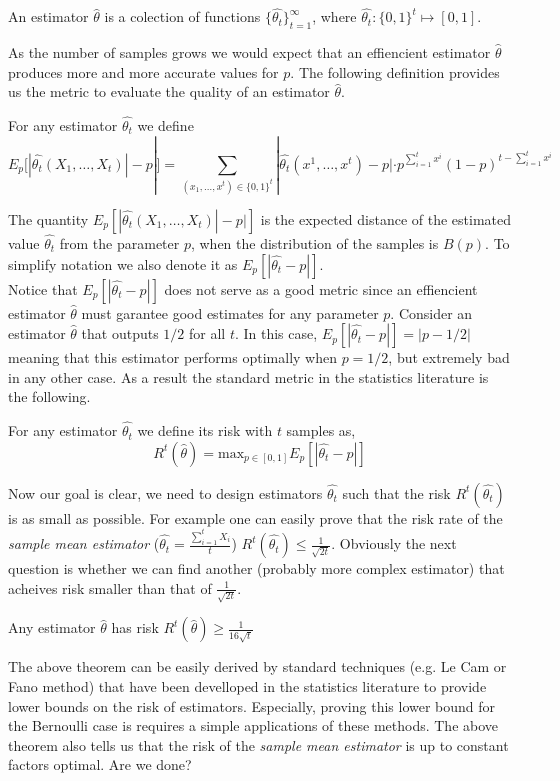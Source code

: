 \begin{definition}
An estimator $\hat{\theta}$ is a colection of functions $\{\hat{\theta_t}\}_{t=1}^{\infty}$, where $\hat{\theta_t}: \{0,1\}^t\mapsto [0,1]$.
\end{definition} As the number of samples grows we would expect that an effiencient estimator $\hat{\theta}$ produces more and more accurate values for $p$. The following definition provides us the metric to evaluate the quality of an estimator $\hat{\theta}$. 

\begin{definition}
For any estimator $\hat{\theta_t}$ we define 
$$E_p[|\hat{\theta_t}(X_1,\ldots,X_t)| - p|]= \sum_{(x_1,\ldots,x^t)\in \{0,1\}^t}|\hat{\theta_t}(x^1,\ldots,x^t) -p| \cdot p^{\sum_{i=1}^tx^i}(1-p)^{t-\sum_{i=1}^tx^i}$$ 
\end{definition}
The quantity $E_p[|\hat{\theta_t}(X_1,\ldots,X_t)| - p|]$ is the expected distance of the estimated value $\hat{\theta_t}$ from the parameter $p$, when the distribution of the samples is $B(p)$. To simplify notation we also denote it as $E_p[|\hat{\theta_t} - p|]$.\\

\noindent Notice that $E_p[|\hat{\theta_t}-p|]$ does not serve as a good metric since an effiencient estimator $\hat{\theta}$ must garantee good estimates for any parameter $p$. Consider an estimator $\hat{\theta}$ that outputs $1/2$ for all $t$. In this case, $E_{p}[|\hat{\theta_t}- p|]=|p-1/2|$ meaning that this estimator performs optimally when $p=1/2$, but extremely bad in any other case. As a result the standard metric in the statistics literature is the following.

\begin{definition}
For any estimator $\hat{\theta_t}$ we define its risk with $t$ samples as, $$R^t(\hat{\theta})=\text{max}_{p \in [0,1]}E_p[|\hat{\theta_t} - p|]$$
\end{definition}Now our goal is clear, we need to design estimators $\hat{\theta_t}$ such that the risk $R^t(\hat{\theta_t})$ is as small as possible. For example one can easily prove that the risk rate of the \emph{sample mean estimator} ($\hat{\theta_t}= \frac{\sum_{i=1}^t X_i}{t}$) $R^t(\hat{\theta_t}) \leq \frac{1}{\sqrt{2t}}$. Obviously the next question is whether we can find another (probably more complex estimator) that acheives risk smaller than that of $\frac{1}{\sqrt{2t}}$.   

\begin{theorem}\label{thm: risk_optimality}
Any estimator $\hat{\theta}$ has risk $R^t(\hat{\theta}) \geq \frac{1}{16\sqrt{t}}$
\end{theorem}
The above theorem can be easily derived by standard techniques (e.g. Le Cam or Fano method) that have been develloped in the statistics literature to provide lower bounds on the risk of estimators. Especially, proving this lower bound for the Bernoulli case is requires a simple applications of these methods. The above theorem also tells us that the risk of the \emph{sample mean estimator} is up to constant factors optimal. Are we done?

